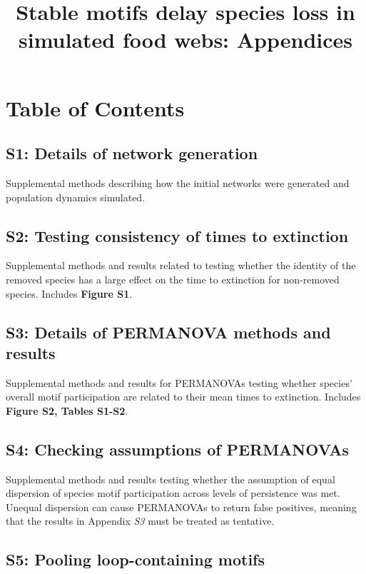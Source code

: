 \documentclass[12pt]{article}
\title{Stable motifs delay species loss in simulated food webs: Appendices}
\date{}
\author{}
\begin{document}
 
\maketitle 
\raggedright
\setlength{\parindent}{15pt} 

\section*{Table of Contents}

    \subsection*{S1: Details of network generation}

        Supplemental methods describing how the initial networks were generated and population dynamics simulated.

    \subsection*{S2: Testing consistency of times to extinction}
    
        Supplemental methods and results related to testing whether the identity of the removed species has a large effect on the time to extinction for non-removed species. Includes \textbf{Figure S1}.
    
    \subsection*{S3: Details of PERMANOVA methods and results}
        
        Supplemental methods and results for PERMANOVAs testing whether species' overall motif participation are related to their mean times to extinction. Includes \textbf{Figure S2, Tables S1-S2}.

    \subsection*{S4: Checking assumptions of PERMANOVAs}


    	Supplemental methods and results testing whether the assumption of equal dispersion of species motif participation across levels of persistence was met. Unequal dispersion can cause PERMANOVAs to return false positives, meaning that the results in Appendix \emph{S3} must be treated as tentative.


    \subsection*{S5: Pooling loop-containing motifs}
\end{document}
